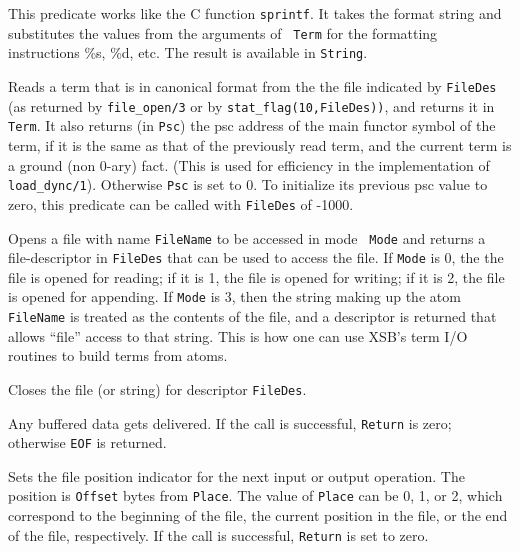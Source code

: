 \begin{description}
    This predicate works like the C function {\tt sprintf}. It takes the
    format string and substitutes the values from the arguments of {\tt
      Term} for the formatting instructions \%s, \%d, etc. The result is
    available in {\tt String}.

    Reads a term that is in canonical format from the the file
    indicated by {\tt FileDes} (as returned by {\tt file\_open/3} or
    by {\tt stat\_flag(10,FileDes))}, and returns it in {\tt Term}.
    It also returns (in {\tt Psc}) the psc address of the main functor
    symbol of the term, if it is the same as that of the previously
    read term, and the current term is a ground (non 0-ary) fact.
    (This is used for efficiency in the implementation of {\tt
    load\_dync/1}).  Otherwise {\tt Psc} is set to 0.  To initialize
    its previous psc value to zero, this predicate can be called with
    {\tt FileDes} of -1000.

    Opens a file with name {\tt FileName} to be accessed in mode {\tt
    Mode} and returns a file-descriptor in {\tt FileDes} that can be
    used to access the file.  If {\tt Mode} is 0, the the file is
    opened for reading; if it is 1, the file is opened for writing; if
    it is 2, the file is opened for appending.  If {\tt Mode} is 3,
    then the string making up the atom {\tt FileName} is treated as
    the contents of the file, and a descriptor is returned that allows
    ``file'' access to that string.  This is how one can use
    XSB's term I/O routines to build terms from atoms.

    Closes the file (or string) for descriptor {\tt FileDes}.

    Any buffered data gets delivered. If the call is successful, {\tt Return}
    is zero; otherwise {\tt EOF} is returned.

    Sets the file position indicator for the next input or output
    operation. The position is {\tt Offset} bytes from {\tt Place}.
    The value of {\tt Place} can be 0, 1, or 2, which correspond to
    the beginning of the file, the current position in the file, or
    the end of the file, respectively. If the call is successful,
    {\tt Return} is set to zero.


\end{description}
